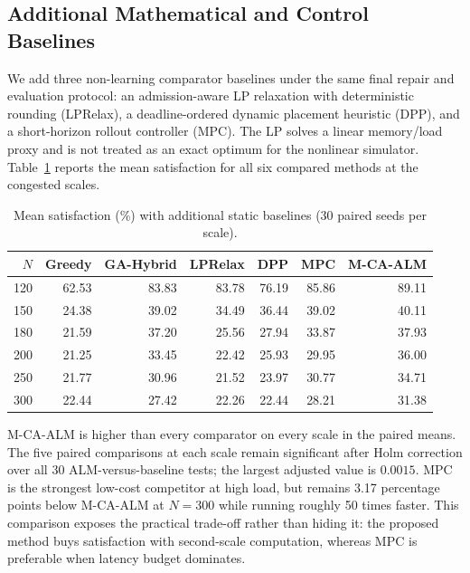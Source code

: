 \documentclass[pdflatex,sn-mathphys-num]{sn-jnl}
\begin{document}
\subsection{Additional Mathematical and Control Baselines}
We add three non-learning comparator baselines under the same final repair and evaluation protocol: an admission-aware LP relaxation with deterministic rounding (LPRelax), a deadline-ordered dynamic placement heuristic (DPP), and a short-horizon rollout controller (MPC). The LP solves a linear memory/load proxy and is not treated as an exact optimum for the nonlinear simulator. Table~\ref{tab:official_baselines} reports the mean satisfaction for all six compared methods at the congested scales.

\begin{table}[t]
\centering
\caption{Mean satisfaction (\%) with additional static baselines (30 paired seeds per scale).}
\label{tab:official_baselines}
\small
\begin{tabular}{rrrrrrr}
\toprule
$N$ & Greedy & GA-Hybrid & LPRelax & DPP & MPC & M-CA-ALM \\
\midrule

120 & 62.53 & 83.83 & 83.78 & 76.19 & 85.86 & 89.11 \\
150 & 24.38 & 39.02 & 34.49 & 36.44 & 39.02 & 40.11 \\
180 & 21.59 & 37.20 & 25.56 & 27.94 & 33.87 & 37.93 \\
200 & 21.25 & 33.45 & 22.42 & 25.93 & 29.95 & 36.00 \\
250 & 21.77 & 30.96 & 21.52 & 23.97 & 30.77 & 34.71 \\
300 & 22.44 & 27.42 & 22.26 & 22.44 & 28.21 & 31.38

 \\
\bottomrule
\end{tabular}
\end{table}

M-CA-ALM is higher than every comparator on every scale in the paired means. The five paired comparisons at each scale remain significant after Holm correction over all 30 ALM-versus-baseline tests; the largest adjusted value is $0.0015$. MPC is the strongest low-cost competitor at high load, but remains 3.17 percentage points below M-CA-ALM at $N=300$ while running roughly 50 times faster. This comparison exposes the practical trade-off rather than hiding it: the proposed method buys satisfaction with second-scale computation, whereas MPC is preferable when latency budget dominates.
\end{document}
